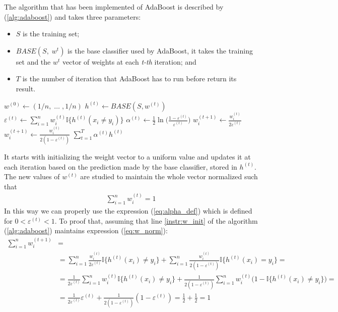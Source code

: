 The algorithm that has been implemented of AdaBoost is described by (\ref{alg:adaboost}) and takes three parameters:
\begin{itemize}
	\item $S$ is the training set;
	\item $BASE(S,\;w^{t})$ is the base classifier used by AdaBoost, it takes the training set and the $w^{t}$ vector of weights at each \textit{t-th} iteration; and
	\item $T$ is the number of iteration that AdaBoost has to run before return its result.
\end{itemize}
\begin{algorithm}[htpb]
	\caption{}
	\label{alg:adaboost}
	\begin{algorithmic}[1]
		\State $w^{(0)} \gets (1/n,\;\dots\;,1/n)$ \label{instr:w_init}
			\State $h^{(t)} \gets BASE(S, w^{(t)})$
			\State $\varepsilon^{(t)} \gets \sum_{i=1}^{n}w_{i}^{(t)}\mathbb{I}\lbrace h^{(t)}(x_{i} \neq y_{i}) \rbrace $
			\State $\alpha^{(t)} \gets \frac{1}{2}\ln\Big(\frac{1-\varepsilon^{(t)}}{\varepsilon^{(t)}}\Big)$
					\State $w_{i}^{(t+1)}\gets\frac{w_{i}^{(t)}}{2\varepsilon^{(t)}}$
				\Else
					\State $w_{i}^{(t+1)}\gets\frac{w_{i}^{(t)}}{2(1-\varepsilon^{(t)})}$
				\EndIf
			\EndFor
		\EndFor
		\Return $\sum_{t=1}^{T}\alpha^{(t)}h^{(t)}$
		\EndProcedure
	\end{algorithmic}
\end{algorithm}
It starts with initializing the weight vector to a uniform value and updates it at each iteration based on the prediction made by the base classifier, stored in $h^{(t)}$. The new values of $w^{(t)}$ are studied to maintain the whole vector normalized such that
\begin{align}
	\label{eq:w_norm}
	\sum_{i=1}^{n}w^{(t)}_{i} = 1
\end{align}
In this way we can properly use the expression (\ref{eq:alpha_def}) which is defined for $0 < \varepsilon^{(t)} < 1$.
To proof that, assuming that line \ref{instr:w_init} of the algorithm (\ref{alg:adaboost}) maintains expression (\ref{eq:w_norm}):
\begin{equation*}
\begin{split}
	\sum_{i=1}^{n}w_{i}^{(t+1)} & = \\
	& = \sum_{i=1}^{n}\frac{w_{i}^{(t)}}{2\varepsilon^{(t)}}\mathbb{I}
		\lbrace 
			h^{(t)}(x_{i}) \neq y_{i}
		\rbrace 
	+
	\sum_{i=1}^{n}\frac{w_{i}^{(t)}}{2(1-\varepsilon^{(t)})}\mathbb{I}
	\lbrace
		h^{(t)}(x_{i}) = y_{i}
	\rbrace = \\ 
	& = \frac{1}{2\varepsilon^{(t)}}\sum_{i=1}^{n}w_{i}^{(t)}\mathbb{I}
	\lbrace 
		h^{(t)}(x_{i}) \neq y_{i} 
	\rbrace 
	+ 
	\frac{1}{2(1-\varepsilon^{(t)})}\sum_{i=1}^{n}w_{i}^{(t)}
	\big(
		1-\mathbb{I} \lbrace
			{h^{(t)}}(x_{i}) \neq y_{i}
		\rbrace
	\big) = \\ 
	& = \frac{1}{2\varepsilon^{(t)}}\varepsilon^{(t)}+\frac{1}{2(1-\varepsilon^{(t)})}
	(
		1-\varepsilon^{(t)}
	) =
	\frac{1}{2} + \frac{1}{2} = 1
\end{split}
\end{equation*}





